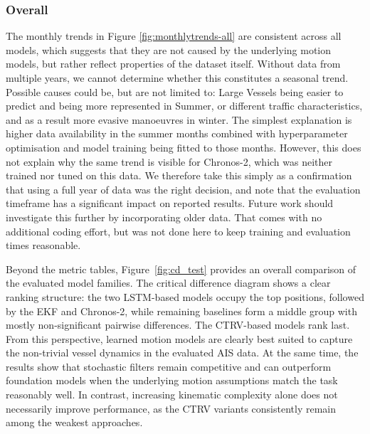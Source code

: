                 \subsubsection{Overall}
                    The monthly trends in Figure \ref{fig:monthlytrends-all} are consistent across all models, which suggests that they are not caused by the underlying motion models, but rather reflect properties of the dataset itself.
                   Without data from multiple years, we cannot determine whether this
                    constitutes a seasonal trend.
                    Possible causes could be, but are not limited to: Large Vessels being easier to predict and being more represented in Summer, or  different traffic characteristics, and as a result more evasive manoeuvres in winter. The simplest explanation is higher data availability in the
                    summer months combined with hyperparameter optimisation and model training being fitted to those months.
                    However, this does not explain why the same trend is visible for Chronos-2, which was neither trained nor tuned on this data.
                    We therefore take this simply as a confirmation that using a full year of data was the right decision, and note that the evaluation timeframe has a significant impact on reported results. Future work should investigate this further by incorporating older data. That comes with no additional coding effort, but was not done here to keep training and evaluation times reasonable.
                    
                    Beyond the metric tables, Figure~\ref{fig:cd_test} provides an overall comparison of the evaluated model families. The critical difference diagram shows a clear ranking structure: the two LSTM-based models occupy the top positions, followed by the EKF and Chronos-2, while remaining baselines form a middle group with mostly non-significant pairwise differences. The CTRV-based models rank last.\\                    
                    From this perspective, learned motion models are clearly best suited to capture the non-trivial vessel dynamics in the evaluated AIS data. At the same time, the results show that stochastic filters remain competitive and can outperform foundation models when the underlying motion assumptions match the task reasonably well. In contrast, increasing kinematic complexity alone does not necessarily improve performance, as the CTRV variants consistently remain among the weakest approaches.
                    





